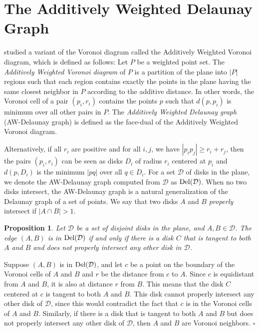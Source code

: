 \documentclass[pdftex,leqno,fleqn,12pt]{article}
\newcommand{\DEL}{{\rm{Del}}}
\newtheorem{proposition}[theorem]{Proposition}
\newenvironment{proof}{{\textit Proof:} \rm}{\hfill $\square$ \medskip\\}
\begin{document}
\section{The Additively Weighted Delaunay Graph}\label{section-disk-del-spanning-ratio}


\citet{drysdale81} studied a variant of the Voronoi diagram called the Additively Weighted Voronoi
diagram, which is defined as follows: Let $P$ be a weighted point set. The \emph{Additively
Weighted Voronoi diagram} of $P$ is a partition of the plane into $|P|$ regions such that each
region contains exactly the points in the plane having the same closest neighbor in $P$ according
to the additive distance. In other words, the Voronoi cell of a pair $(p_i,r_i)$ contains the
points $p$ such that $d(p,p_i)$ is minimum over all other pairs in $P$. The \emph{Additively
Weighted Delaunay graph} (AW-Delaunay graph) is defined as the face-dual of the Additively Weighted
Voronoi diagram.

Alternatively, if all $r_i$ are positive and for all $i,j$, we have $|p_ip_j|\geq r_i+r_j$, then
the pairs $(p_i,r_i)$ can be seen as disks $D_i$ of radius $r_i$ centered at $p_i$ and $d(p,D_i)$
is the minimum $|pq|$ over all $q\in D_i$. For a set $\mathcal{D}$ of disks in the plane, we
denote the AW-Delaunay graph computed from $\mathcal{D}$ as $\DEL(\mathcal{D})$. When no two disks
intersect, the AW-Delaunay graph is a natural generalization of the Delaunay graph of a set of
points. We say that two disks $A$ and $B$ \emph{properly} intersect if $|A\cap B|>1$.


\begin{proposition}\label{prop-dual} Let $\mathcal{D}$ be a set of disjoint disks in the
plane, and $A,B\in\mathcal{D}$. The edge $(A,B)$ is in $\DEL(\mathcal{D})$ if and only if there is
a disk $C$ that is tangent to both $A$ and $B$ and does not properly intersect any other disk in
$\mathcal{D}$.
\end{proposition}
\begin{proof}Suppose $(A,B)$ is in $\DEL(\mathcal{D})$, and let $c$
be a point on the boundary of the Voronoi cells of $A$ and $B$ and $r$ be the distance from $c$ to
$A$. Since $c$ is equidistant from $A$ and $B$, it is also at distance $r$ from $B$. This means that
the disk $C$ centered at $c$ is tangent to both $A$ and $B$. This disk cannot properly intersect
any other disk of $\mathcal{D}$, since this would contradict the fact that $c$ is in the Voronoi
cells of $A$ and $B$. Similarly, if there is a disk that is tangent to both $A$ and $B$ but does
not properly intersect any other disk of $\mathcal{D}$, then $A$ and $B$ are Voronoi neighbors.
\end{proof}
\end{document}
